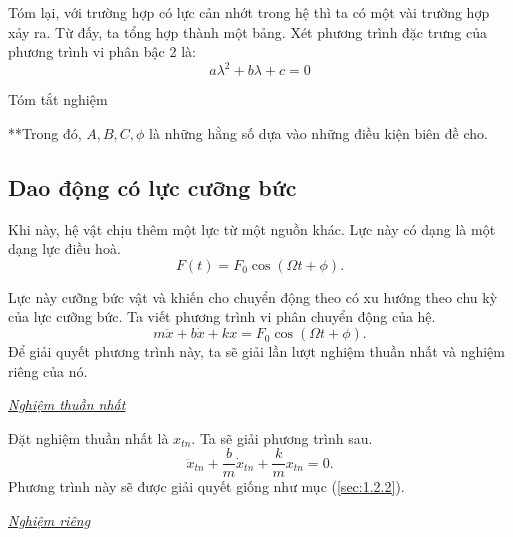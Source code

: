 Tóm lại, với trường hợp có lực cản nhớt trong hệ thì ta có một vài trường hợp xảy ra. Từ đấy, ta tổng hợp thành một bảng. Xét phương trình đặc trưng của phương trình vi phân bậc 2 là:
\begin{equation*}
    a\lambda^2 + b\lambda + c = 0 
\end{equation*}

\begin{table}[!htb]
    \centering
    \caption{Tóm tắt nghiệm}
    
    \label{tab:1.7}
\end{table}

**Trong đó, \(A, B, C, \phi\) là những hằng số dựa vào những điều kiện biên đề cho.

\subsection{Dao động có lực cưỡng bức}
Khi này, hệ vật chịu thêm một lực từ một nguồn khác. Lực này có dạng là một dạng lực điều hoà.
\begin{equation}
    F(t) = F_0 \cos{\left(\Omega t + \phi \right)}.
    \label{eq:1.15}
\end{equation}

\begin{figure}[!htb]
    \centering
    
    \caption{}
    \label{fig:1.9}
\end{figure}

Lực này cưỡng bức vật và khiến cho chuyển động theo có xu hướng theo chu kỳ của lực cưỡng bức. Ta viết phương trình vi phân chuyển động của hệ.
\begin{equation}
    m \ddot{x} + b \dot{x} + k x  = F_0 \cos{\left(\Omega t + \phi \right)}.
    \label{eq:1.16}
\end{equation}
Để giải quyết phương trình này, ta sẽ giải lần lượt nghiệm thuần nhất và nghiệm riêng của nó.
\vspace{2mm}

\underline{\textit{Nghiệm thuần nhất}}

Đặt nghiệm thuần nhất là \(x_{tn}\). Ta sẽ giải phương trình sau.
\begin{equation}
    \ddot{x}_{tn} + {\displaystyle \frac{b}{m}} \dot{x}_{tn} + {\displaystyle \frac{k}{m}} x_{tn} = 0.
    \label{eq:1.17}
\end{equation}
Phương trình này sẽ được giải quyết giống như mục (\ref{sec:1.2.2}). 
\vspace{2mm}

\underline{\textit{Nghiệm riêng}}

